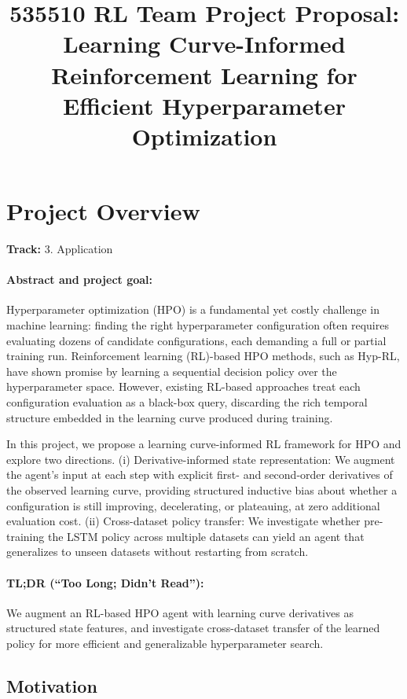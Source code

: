 \documentclass[12pt]{article}
\title{535510 RL Team Project Proposal: \\ Learning Curve-Informed Reinforcement Learning for Efficient Hyperparameter Optimization}
\author{}
\date{}
\begin{document}
\maketitle

\section{Project Overview}

\noindent\textbf{Track:} 3. Application

\paragraph{Abstract and project goal:}
Hyperparameter optimization (HPO) is a fundamental yet costly challenge in machine learning: finding the right hyperparameter configuration often requires evaluating dozens of candidate configurations, each demanding a full or partial training run. Reinforcement learning (RL)-based HPO methods, such as Hyp-RL, have shown promise by learning a sequential decision policy over the hyperparameter space. However, existing RL-based approaches treat each configuration evaluation as a black-box query, discarding the rich temporal structure embedded in the learning curve produced during training.

In this project, we propose a learning curve-informed RL framework for HPO and explore two directions. (i) Derivative-informed state representation: We augment the agent's input at each step with explicit first- and second-order derivatives of the observed learning curve, providing structured inductive bias about whether a configuration is still improving, decelerating, or plateauing, at zero additional evaluation cost. (ii) Cross-dataset policy transfer: We investigate whether pre-training the LSTM policy across multiple datasets can yield an agent that generalizes to unseen datasets without restarting from scratch.

\paragraph{TL;DR (``Too Long; Didn't Read''):}
We augment an RL-based HPO agent with learning curve derivatives as structured state features, and investigate cross-dataset transfer of the learned policy for more efficient and generalizable hyperparameter search.

\subsection{Motivation}
\end{document}
